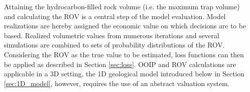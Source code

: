         Attaining the hydrocarbon-filled rock volume (i.e. the maximum trap volume) and calculating the ROV is a central step of the model evaluation. Model realizations are hereby assigned the economic value on which decisions are to be based. Realized volumetric values from numerous iterations and several simulations are combined to sets of probability distributions of the ROV. Considering the ROV as the true value to be estimated, loss functions can then be applied as described in Section \ref{sec:loss}. OOIP and ROV calculations are applicable in a 3D setting, the 1D geological model introduced below in Section \ref{sec:1D_model}, however, requires the use of an abstract valuation system.
		
